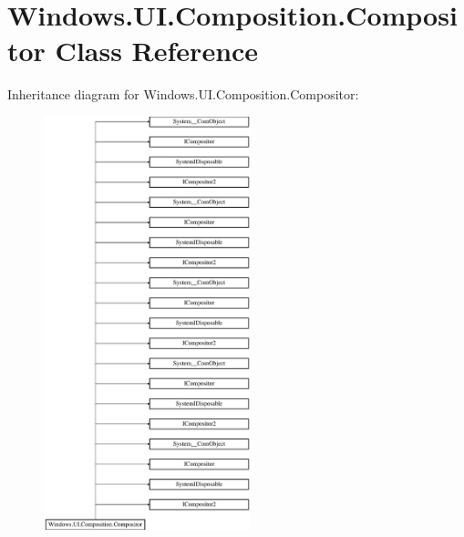\hypertarget{class_windows_1_1_u_i_1_1_composition_1_1_compositor}{}\section{Windows.\+U\+I.\+Composition.\+Compositor Class Reference}
\label{class_windows_1_1_u_i_1_1_composition_1_1_compositor}
Inheritance diagram for Windows.\+U\+I.\+Composition.\+Compositor\+:\begin{figure}[H]
\begin{center}
\leavevmode
\includegraphics[height=12.000000cm]{class_windows_1_1_u_i_1_1_composition_1_1_compositor}
\end{center}
\end{figure}
